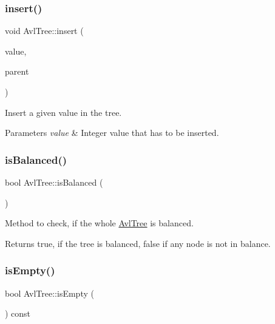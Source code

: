 \subsubsection{\texorpdfstring{insert()}{insert()}\hspace{0.1cm}{\footnotesize\ttfamily [2/2]}}
{\footnotesize\ttfamily void Avl\+Tree\+::insert (\begin{DoxyParamCaption}\item[{const int}]{value,  }\item[{\mbox{\hyperlink{struct_avl_tree_1_1_node}{Avl\+Tree\+::\+Node}} $\ast$}]{parent }\end{DoxyParamCaption})}

Insert a given value in the tree. 
\begin{DoxyParams}{Parameters}
{\em value} & Integer value that has to be inserted. \\
\hline
\end{DoxyParams}
\mbox{\label{class_avl_tree_af8f43d1139179e490fffbdd03f7735ac}} 
\subsubsection{\texorpdfstring{is\+Balanced()}{isBalanced()}}
{\footnotesize\ttfamily bool Avl\+Tree\+::is\+Balanced (\begin{DoxyParamCaption}{ }\end{DoxyParamCaption})}

Method to check, if the whole \mbox{\hyperlink{class_avl_tree}{Avl\+Tree}} is balanced. \begin{DoxyReturn}{Returns}
true, if the tree is balanced, false if any node is not in balance. 
\end{DoxyReturn}
\mbox{\label{class_avl_tree_a62de2a25d97e2da309696ea2eef3fec4}} 
\subsubsection{\texorpdfstring{is\+Empty()}{isEmpty()}}
{\footnotesize\ttfamily bool Avl\+Tree\+::is\+Empty (\begin{DoxyParamCaption}{ }\end{DoxyParamCaption}) const}

